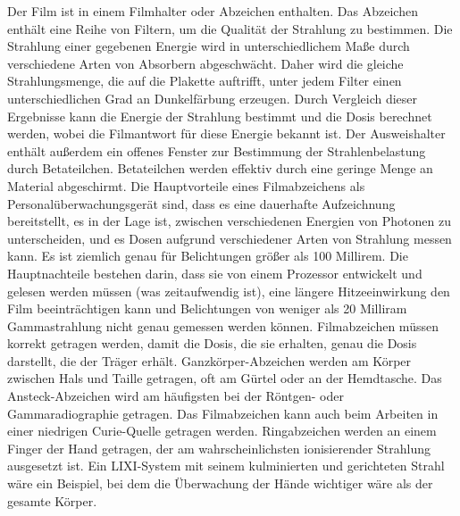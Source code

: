 {Der Film ist in einem Filmhalter oder Abzeichen enthalten. Das Abzeichen enthält eine Reihe von Filtern, um die Qualität der Strahlung zu bestimmen. Die Strahlung einer gegebenen Energie wird in unterschiedlichem Maße durch verschiedene Arten von Absorbern abgeschwächt. Daher wird die gleiche Strahlungsmenge, die auf die Plakette auftrifft, unter jedem Filter einen unterschiedlichen Grad an Dunkelfärbung erzeugen. Durch Vergleich dieser Ergebnisse kann die Energie der Strahlung bestimmt und die Dosis berechnet werden, wobei die Filmantwort für diese Energie bekannt ist. Der Ausweishalter enthält außerdem ein offenes Fenster zur Bestimmung der Strahlenbelastung durch Betateilchen. Betateilchen werden effektiv durch eine geringe Menge an Material abgeschirmt.
Die Hauptvorteile eines Filmabzeichens als Personalüberwachungsgerät sind, dass es eine dauerhafte Aufzeichnung bereitstellt, es in der Lage ist, zwischen verschiedenen Energien von Photonen zu unterscheiden, und es Dosen aufgrund verschiedener Arten von Strahlung messen kann. Es ist ziemlich genau für Belichtungen größer als 100 Millirem. 
Die Hauptnachteile bestehen darin, dass sie von einem Prozessor entwickelt und gelesen werden müssen (was zeitaufwendig ist), eine längere Hitzeeinwirkung den Film beeinträchtigen kann und Belichtungen von weniger als 20 Milliram Gammastrahlung nicht genau gemessen werden können.
Filmabzeichen müssen korrekt getragen werden, damit die Dosis, die sie erhalten, genau die Dosis darstellt, die der Träger erhält. Ganzkörper-Abzeichen werden am Körper zwischen Hals und Taille getragen, oft am Gürtel oder an der Hemdtasche. Das Ansteck-Abzeichen wird am häufigsten bei der Röntgen- oder Gammaradiographie getragen. Das Filmabzeichen kann auch beim Arbeiten in einer niedrigen Curie-Quelle getragen werden. Ringabzeichen werden an einem Finger der Hand getragen, der am wahrscheinlichsten ionisierender Strahlung ausgesetzt ist. Ein LIXI-System mit seinem kulminierten und gerichteten Strahl wäre ein Beispiel, bei dem die Überwachung der Hände wichtiger wäre als der gesamte Körper.
}
